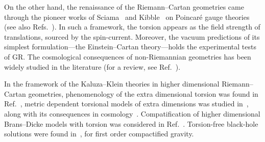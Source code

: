 \documentclass[aps,prd,12pt,superscriptaddress,showpacs,showkeys,longbibliography,reprint,nofootinbib]{revtex4-1}
\begin{document}
On the other hand, the renaissance of the Riemann--Cartan geometries came through the pioneer works of Sciama~\cite{Sciama:1962} and Kibble~\cite{Kibble:1961ba} on Poincar\'e gauge theories (see also Refs.~\cite{Blagojevic:2002du,*Hehl:1976kj}). In such a framework, the torsion appears as the field strength of translations, sourced by the spin-current.
Moreover, the vacuum predictions of its simplest formulation---the Einstein--Cartan theory---holds the experimental tests of GR. The cosmological consequences of non-Riemannian geometries has been widely studied in the literature (for a review, see Ref.~\cite{Puetzfeld:2004yg}). %

In the framework of the Kaluza--Klein theories in higher dimensional Riemann--Cartan geometries, phenomenology of the extra dimensional torsion was found in Ref.~\cite{Kalinowski:1980da}, metric dependent torsional models of extra dimensions was studied in~\cite{Shankar:2012vd}, along with its consequences in cosmology~\cite{Chen:2009ep}. Compatification of higher dimensional Brans--Dicke models with torsion was considered in Ref.~\cite{German:1993bq}. Torsion-free black-hole solutions were found in~\cite{Aros:2007nn}, for first order compactified gravity.
\end{document}
